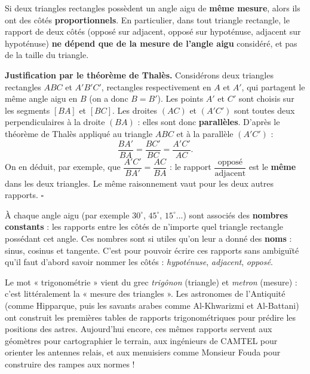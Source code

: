 \documentclass[11pt]{article}
\newcommand{\cle}[1]{{\popxbold\color{popdark}#1}}
\begin{document}
\begin{propriete}
Si deux triangles rectangles possèdent un angle aigu de \textbf{même mesure}, alors ils ont des côtés \textbf{proportionnels}. En particulier, dans tout triangle rectangle, le rapport de deux côtés (opposé sur adjacent, opposé sur hypoténuse, adjacent sur hypoténuse) \textbf{ne dépend que de la mesure de l'angle aigu} considéré, et pas de la taille du triangle.
\end{propriete}

\textbf{Justification par le théorème de Thalès.} Considérons deux triangles rectangles $ABC$ et $A'B'C'$, rectangles respectivement en $A$ et $A'$, qui partagent le même angle aigu en $B$ (on a donc $B = B'$). Les points $A'$ et $C'$ sont choisis sur les segments $[BA]$ et $[BC]$.
Les droites $(AC)$ et $(A'C')$ sont toutes deux perpendiculaires à la droite $(BA)$ : elles sont donc \textbf{parallèles}. D'après le théorème de Thalès appliqué au triangle $ABC$ et à la parallèle $(A'C')$ :
\[ \frac{BA'}{BA} = \frac{BC'}{BC} = \frac{A'C'}{AC}. \]
On en déduit, par exemple, que $\dfrac{A'C'}{BA'} = \dfrac{AC}{BA}$ : le rapport $\dfrac{\text{opposé}}{\text{adjacent}}$ est le \textbf{même} dans les deux triangles. Le même raisonnement vaut pour les deux autres rapports. \hfill $\square$

\begin{aretenir}
À chaque angle aigu (par exemple $30^{\circ}$, $45^{\circ}$, $15^{\circ}$...) sont associés des \textbf{nombres constants} : les rapports entre les côtés de n'importe quel triangle rectangle possédant cet angle. Ces nombres sont si utiles qu'on leur a donné des \textbf{noms} : \cle{sinus}, \cle{cosinus} et \cle{tangente}. C'est pour pouvoir écrire ces rapports sans ambiguïté qu'il faut d'abord savoir nommer les côtés : \emph{hypoténuse}, \emph{adjacent}, \emph{opposé}.
\end{aretenir}

\begin{savaistu}
Le mot « trigonométrie » vient du grec \emph{trigônon} (triangle) et \emph{metron} (mesure) : c'est littéralement la « mesure des triangles ». Les astronomes de l'Antiquité (comme Hipparque, puis les savants arabes comme Al-Khwarizmi et Al-Battani) ont construit les premières tables de rapports trigonométriques pour prédire les positions des astres. Aujourd'hui encore, ces mêmes rapports servent aux géomètres pour cartographier le terrain, aux ingénieurs de CAMTEL pour orienter les antennes relais, et aux menuisiers comme Monsieur Fouda pour construire des rampes aux normes !
\end{savaistu}
\end{document}
